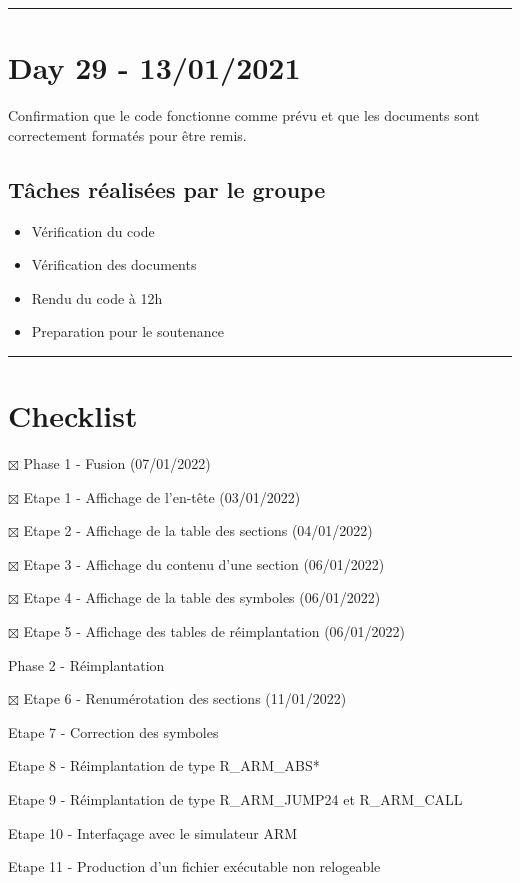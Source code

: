 \documentclass[11pt,letterpaper]{article}
\begin{document}
\noindent\rule{13cm}{0.4pt}

\section*{Day 29 - 13/01/2021}
Confirmation que le code fonctionne comme prévu et que les documents sont 
correctement formatés pour être remis.

\subsection*{Tâches réalisées par le groupe}
\begin{itemize}
    \item Vérification du code
    \item Vérification des documents
    \item Rendu du code à 12h
    \item Preparation pour le soutenance
\end{itemize}

\noindent\rule{13cm}{0.4pt}

\section*{Checklist}
\begin{todolist}
    \item[$\boxtimes$] Phase 1 - Fusion (07/01/2022)
    \begin{todolist}
      \item[$\boxtimes$] Etape 1 - Affichage de l'en-tête  (03/01/2022)
      \item[$\boxtimes$] Etape 2 - Affichage de la table des sections (04/01/2022)
      \item[$\boxtimes$] Etape 3 - Affichage du contenu d'une section (06/01/2022)
      \item[$\boxtimes$] Etape 4 - Affichage de la table des symboles (06/01/2022)
      \item[$\boxtimes$] Etape 5 - Affichage des tables de réimplantation (06/01/2022)
    \end{todolist}
    \item Phase 2 - Réimplantation
    \begin{todolist}
        \item[$\boxtimes$] Etape 6 - Renumérotation des sections (11/01/2022)
        \item Etape 7 - Correction des symboles 
        \item Etape 8 - Réimplantation de type R\_ARM\_ABS*
        \item Etape 9 - Réimplantation de type R\_ARM\_JUMP24 et 
        R\_ARM\_CALL
        \item Etape 10 - Interfaçage avec le simulateur ARM 
        \item Etape 11 - Production d'un fichier exécutable non relogeable
      \end{todolist}
  \end{todolist}
\end{document}

